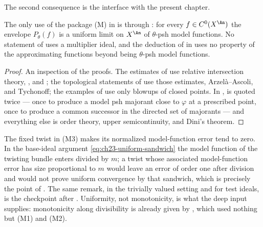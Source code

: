The second consequence is the interface with the present chapter.

\begin{proposition}
\label{prop:ch22-multiplier-interface}
The only use of the package \textup{(M)} in
 is through
: for every $f\in C^0(X^{\An})$ the
envelope $P_\theta(f)$ is a uniform limit on $X^{\An}$ of
$\theta$-psh model functions.  No statement of
 uses a multiplier ideal, and the deduction
of  in
 uses no property of the approximating
functions beyond being $\theta$-psh model functions.
\end{proposition}

\begin{proof}
An inspection of the proofs.  The estimates of
 use relative intersection theory,
, and ; the
topological statements of
 use those estimates, Arzel\`a--Ascoli, and
Tychonoff; the examples of  use only blowups of closed
points.  In ,
 is quoted twice --- once to produce a
model psh majorant close to $\varphi$ at a prescribed point, once to
produce a common successor in the directed set of majorants --- and
everything else is order theory, upper semicontinuity, and Dini's theorem.
\end{proof}

\begin{remark}
\label{rem:ch22-fixed-twist}
The fixed twist in (M3) makes its normalized model-function error tend
to zero.  In the base-ideal argument
\eqref{eq:ch23-uniform-sandwich} the model function of the twisting bundle
enters divided by $m$; a twist whose associated model-function error has
size proportional to
$m$ would leave an error of order one after division and would not prove
uniform convergence by that sandwich, which is precisely the point of
.  The same remark, in the
trivially valued setting and for test ideals, is the checkpoint after
.  Uniformity, not
monotonicity, is what the deep input supplies: monotonicity along
divisibility is already given by
, which used nothing but (M1) and (M2).
\end{remark}

